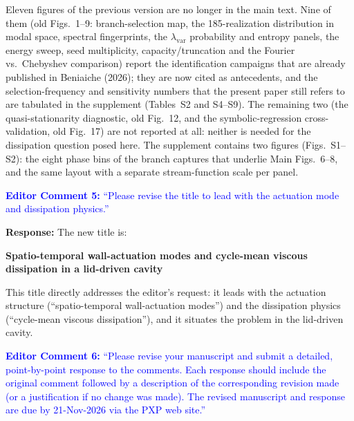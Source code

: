 \documentclass[11pt,a4paper]{article}
\begin{document}
Eleven figures of the previous version are no longer in the main text. Nine of
them (old Figs.~1--9: branch-selection map, the 185-realization distribution in
modal space, spectral fingerprints, the $\lambda_{\mathrm{var}}$ probability and
entropy panels, the energy sweep, seed multiplicity, capacity/truncation and the
Fourier vs.\ Chebyshev comparison) report the identification campaigns that are
already published in Beniaiche (2026); they are now cited as antecedents, and the
selection-frequency and sensitivity numbers that the present paper still refers
to are tabulated in the supplement (Tables~S2 and S4--S9). The remaining two (the
quasi-stationarity diagnostic, old Fig.~12, and the symbolic-regression
cross-validation, old Fig.~17) are not reported at all: neither is needed for the
dissipation question posed here. The supplement contains two figures
(Figs.~S1--S2): the eight phase bins of the branch captures that underlie
Main Figs.~6--8, and the same layout with a separate stream-function scale per
panel.

\vspace{1em}

\noindent\textcolor{blue}{\textbf{Editor Comment 5:} ``Please revise the title
to lead with the actuation mode and dissipation physics.''}

\vspace{0.5em}

\noindent\textbf{Response:} The new title is:

\begin{center}
\textbf{Spatio-temporal wall-actuation modes and cycle-mean viscous dissipation
in a lid-driven cavity}
\end{center}

This title directly addresses the editor's request: it leads with the actuation
structure (``spatio-temporal wall-actuation modes'') and the dissipation physics
(``cycle-mean viscous dissipation''), and it situates the problem in the
lid-driven cavity.

\vspace{1em}

\noindent\textcolor{blue}{\textbf{Editor Comment 6:} ``Please revise your
manuscript and submit a detailed, point-by-point response to the comments. Each
response should include the original comment followed by a description of the
corresponding revision made (or a justification if no change was made). The
revised manuscript and response are due by 21-Nov-2026 via the PXP web site.''}

\vspace{0.5em}
\end{document}
